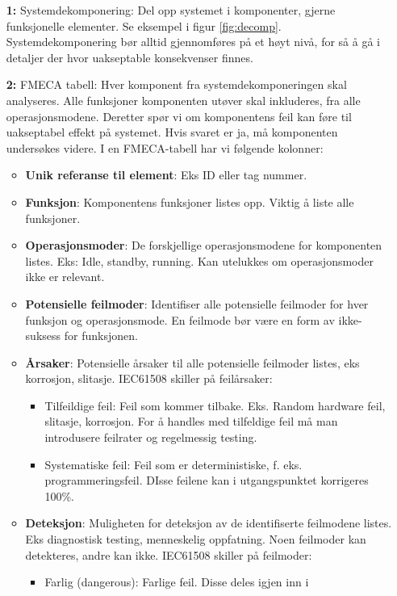 \begin{itemize}
    \item[\textbf{1:}] Systemdekomponering: Del opp systemet i komponenter, gjerne funksjonelle elementer. Se eksempel i figur \ref{fig:decomp}. Systemdekomponering bør alltid gjennomføres på et høyt nivå, for så å gå i detaljer der hvor uakseptable konsekvenser finnes. 
    \item[\textbf{2:}] FMECA tabell: Hver komponent fra systemdekomponeringen skal analyseres. Alle funksjoner komponenten utøver skal inkluderes, fra alle operasjonsmodene. Deretter spør vi om komponentens feil kan føre til uakseptabel effekt på systemet. Hvis svaret er ja, må komponenten undersøkes videre. I en FMECA-tabell har vi følgende kolonner:
    \begin{itemize}
        \item \textbf{Unik referanse til element}: Eks ID eller tag nummer.
        \item \textbf{Funksjon}: Komponentens funksjoner listes opp. Viktig å liste alle funksjoner. 
        \item \textbf{Operasjonsmoder}: De forskjellige operasjonsmodene for komponenten listes. Eks: Idle, standby, running. Kan utelukkes om operasjonsmoder ikke er relevant.
        \item \textbf{Potensielle feilmoder}: Identifiser alle potensielle feilmoder for hver funksjon og operasjonsmode. En feilmode bør være en form av ikke-suksess for funksjonen. 
        \item \textbf{Årsaker}: Potensielle årsaker til alle potensielle feilmoder listes, eks korrosjon, slitasje.
        IEC61508 skiller på feilårsaker:
        \begin{itemize}
            \item Tilfeildige feil: Feil som kommer tilbake. Eks. Random hardware feil, slitasje, korrosjon. For å handles med tilfeldige feil må man introdusere feilrater og regelmessig testing.
            \item Systematiske feil: Feil som er deterministiske, f. eks. programmeringsfeil. DIsse feilene kan i utgangspunktet korrigeres 100\%. 
        \end{itemize}
        \item \textbf{Deteksjon}: Muligheten for deteksjon av de identifiserte feilmodene listes. Eks diagnostisk testing, menneskelig oppfatning. Noen feilmoder kan detekteres, andre kan ikke. IEC61508 skiller på feilmoder:
        \begin{itemize}
            \item Farlig (dangerous): Farlige feil. Disse deles igjen inn i

\end{itemize}
\end{itemize}
\end{itemize}
